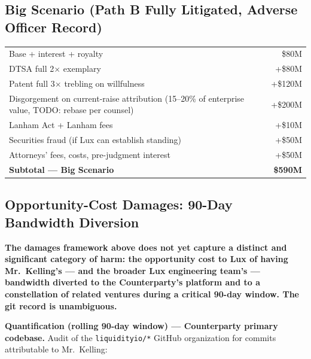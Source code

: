 \documentclass[11pt,letterpaper]{article}
\begin{document}
\subsection*{Big Scenario (Path B Fully Litigated, Adverse Officer Record)}

\begin{center}
\begin{tabular}{lr}
\toprule
Base + interest + royalty & \$80M \\
DTSA full 2$\times$ exemplary & +\$80M \\
Patent full 3$\times$ trebling on willfulness & +\$120M \\
Disgorgement on current-raise attribution (15--20\% of enterprise value, TODO: rebase per counsel) & +\$200M \\
Lanham Act + Lanham fees & +\$10M \\
Securities fraud (if Lux can establish standing) & +\$50M \\
Attorneys' fees, costs, pre-judgment interest & +\$50M \\
\midrule
\textbf{Subtotal --- Big Scenario} & \textbf{\$590M} \\
\bottomrule
\end{tabular}
\end{center}

\subsection*{Opportunity-Cost Damages: 90-Day Bandwidth Diversion}

\textbf{The damages framework above does not yet capture a distinct
and significant category of harm: the opportunity cost to Lux of
having Mr.\ Kelling's --- and the broader Lux engineering team's ---
bandwidth diverted to the Counterparty's platform and to a
constellation of related ventures during a critical 90-day window.
The git record is unambiguous.}

\textbf{Quantification (rolling 90-day window) --- Counterparty
primary codebase.} Audit of the \texttt{liquidityio/*} GitHub
organization for commits attributable to Mr.\ Kelling:
\end{document}
